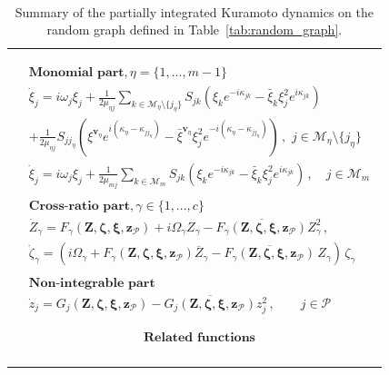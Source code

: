 \documentclass[aps,pre,reprint,longbibliography,superscriptaddress,noshowpacs,floatfix]{revtex4-2}
\theoremstyle{definition}
\theoremstyle{remark}
\begin{document}
\begin{table}[t]
\caption{\\ 
Summary of the partially integrated Kuramoto dynamics on the random graph defined in Table~\ref{tab:random_graph}.}
\begin{ruledtabular}
\label{tab:partially_integrated}
\begin{tabular}{ c }
\parbox[t]{8cm}{\vspace{-1\baselineskip}\begin{align*}
&\textbf{Monomial part}, \eta = \{1,...,m-1\}\\
    &\dot{\xi}_j = i\omega_j\xi_j + \frac{1}{2\mu_{\eta j}} \sum_{k\in\mathcal{M}_{\eta}\setminus \{j_\eta\}}S_{jk} (\xi_ke^{-i\kappa_{jk}} - \bar{\xi}_k\xi_j^2e^{i\kappa_{jk}})\\ & + \frac{1}{2\mu_{\eta j}} S_{jj_\eta } (\xi^{\bm{v}_\eta} e^{i(\kappa_{\eta} - \kappa_{jj_\eta})} - \bar{\xi}^{\bm{v}_\eta}\xi_j^2 e^{-i(\kappa_{\eta} - \kappa_{jj_\eta})} )\,,\,\, j \in \mathcal{M}_{\eta}\setminus\{j_\eta\}\\
    &\dot{\xi}_j = i\omega_j\xi_j + \frac{1}{2\mu_{m j}} \sum_{k\in\mathcal{M}_{m}}S_{jk}(\xi_ke^{-i\kappa_{jk}} - \bar{\xi}_k\xi_j^2e^{i\kappa_{jk}}) \,, \quad j\in\mathcal{M}_m\\
    \\
    &\textbf{Cross-ratio part}, \gamma \in \{1,...,c\}\\
    &\dot{Z}_{\gamma} = F_{\gamma}(\bm{Z}, \bm{\zeta}, \bm{\xi}, \bm{z}_{\mathcal{P}}) + i\Omega_{\gamma} Z_{\gamma} - \overline{F_{\gamma}(\bm{Z}, \bm{\zeta}, \bm{\xi}, \bm{z}_{\mathcal{P}})}Z_{\gamma}^2\,,\\%
    &\dot{\zeta}_{\gamma} = (i\Omega_{\gamma} + F_{\gamma}(\bm{Z}, \bm{\zeta}, \bm{\xi}, \bm{z}_{\mathcal{P}})\overline{Z}_{\gamma} - \overline{F_{\gamma}(\bm{Z}, \bm{\zeta}, \bm{\xi}, \bm{z}_{\mathcal{P}})}\,Z_{\gamma})\,\zeta_{\gamma}\\
    \\
    &\textbf{Non-integrable part}\\
    &\dot{z}_j = 
    G_{j}(\bm{Z}, \bm{\zeta}, \bm{\xi}, \bm{z}_{\mathcal{P}}) - \overline{G_{j}(\bm{Z}, \bm{\zeta}, \bm{\xi}, \bm{z}_{\mathcal{P}})}z_j^2\,,\qquad j \in  \mathcal{P}
\end{align*}}
\quad
\parbox[t]{8cm}{\vspace{-1\baselineskip}\begin{align*}
&\textbf{Related functions}\\

\end{align*}}
\end{tabular}
\end{ruledtabular}
\end{table}
\end{document}
